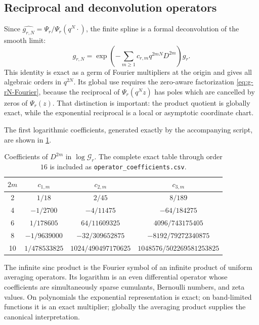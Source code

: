 \documentclass[11pt,oneside]{article}
\numberwithin{equation}{section}
\theoremstyle{definition}
\theoremstyle{remark}
\newcommand{\cG}{\mathcal G}
\begin{document}
\subsection{Reciprocal and deconvolution operators}

Since $\widehat{g_{r,N}}=\Psi_r/\Psi_r(q^N\cdot)$, the finite spline is a
formal deconvolution of the smooth limit:
\begin{equation}
 g_{r,N}
 =\exp\!\left(-\sum_{m\ge1}c_{r,m}q^{2mN}D^{2m}\right)g_r. \label{eq:formal-deconvolution}
\end{equation}
This identity is exact as a germ of Fourier multipliers at the origin and gives
all algebraic orders in $q^{2N}$.  Its global use requires the zero-aware
factorization \eqref{eq:g-rN-Fourier}, because the reciprocal of
$\Psi_r(q^Nz)$ has poles which are cancelled by zeros of $\Psi_r(z)$.
That distinction is important: the product quotient is globally exact, while
the exponential reciprocal is a local or asymptotic coordinate chart.

The first logarithmic coefficients, generated exactly by the accompanying
script, are shown in \cref{tab:operator-coefficients}.

\begin{table}[htbp]
\centering
\small
\begin{tabular}{@{}c c c c@{}}
\toprule
$2m$ & $c_{1,m}$ & $c_{2,m}$ & $c_{3,m}$\\
\midrule
2 & $1/18$ & $2/45$ & $8/189$\\
4 & $-1/2700$ & $-4/11475$ & $-64/184275$\\
6 & $1/178605$ & $64/11609325$ & $4096/743175405$\\
8 & $-1/9639000$ & $-32/309652875$ & $-8192/79272340875$\\
10 & $1/478533825$ & $1024/490497170625$ & $1048576/502269581253825$\\
\bottomrule
\end{tabular}
\caption{Coefficients of $D^{2m}$ in $\log\cG_r$.  The complete exact table
through order $16$ is included as \texttt{operator\_coefficients.csv}.}
\label{tab:operator-coefficients}
\end{table}

\begin{resultbox}
The infinite sinc product is the Fourier symbol of an infinite product of
uniform averaging operators.  Its logarithm is an even differential operator
whose coefficients are simultaneously sparse cumulants, Bernoulli numbers,
and zeta values.  On polynomials the exponential representation is exact; on
band-limited functions it is an exact multiplier; globally the averaging
product supplies the canonical interpretation.
\end{resultbox}
\end{document}
